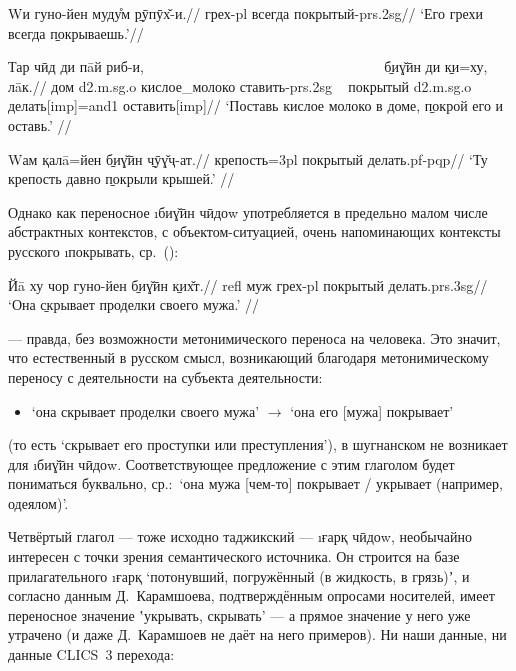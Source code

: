 \begingl
\gla Wи гуно-йен муду̊м \b{рӯпӯх̌-и}.//
 грех-{\sc pl} всегда покрытый-{\sc prs.2sg}//
\glft ‘Его грехи всегда \b{покрываешь}.’//
\endgl \xe

\begingl
\gla Тар чӣд ди пāй риб-и, ~~~~~~~~~~~~~~~~~~~~~~~~~~~~~~~~~ \b{биɣ̌ӣн} ди \b{ки}=ху, лāк.//
 дом {\sc d2.m.sg.o} кислое\_молоко ставить-{\sc prs.2sg} ~ покрытый {\sc d2.m.sg.o} делать[{\sc imp}]={\sc and1} оставить[{\sc imp}]//
\glft ‘Поставь кислое молоко в доме, \b{покрой} его и оставь.’ //
\endgl \xe

\begingl
\gla Wам қалā=йен \b{биɣ̌ӣн} \b{чӯɣ̌ҷ-ат}.//
 крепость={\sc 3pl} покрытый делать.{\sc pf-pqp}//
\glft ‘Ту крепость давно \b{покрыли} крышей.’ //
\endgl \xe

Однако как переносное \i{биɣ̌ӣн чӣдоw} употребляется в предельно малом числе абстрактных контекстов, с объектом-ситуацией, очень напоминающих контексты русского \i{покрывать}, ср.~():

\begingl
\gla Йā ху чор гуно-йен \b{биɣ̌ӣн} \b{ких̌т}.//
 {\sc refl} муж грех-{\sc pl} покрытый делать.{\sc prs.3sg}//
\glft ‘Она \b{скрывает} проделки своего мужа.’ //
\endgl \xe

— правда, без возможности метонимического переноса на человека. Это значит, что естественный в русском смысл, возникающий благодаря метонимическому переносу с деятельности на субъекта деятельности:

\begin{itemize}
  \item ‘она скрывает проделки своего мужа’ $\rightarrow$ ‘она его [мужа] покрывает’
\end{itemize}

(то есть ‘скрывает его проступки или преступления’), в шугнанском не возникает для \i{биɣ̌ӣн чӣдоw}. Соответствующее предложение с этим глаголом будет пониматься буквально, ср.:~‘она мужа [чем-то] покрывает / укрывает (например, одеялом)’.

Четвёртый глагол — тоже исходно таджикский — \i{ғарқ чӣдоw}, необычайно интересен с точки зрения семантического источника. Он строится на базе прилагательного \i{ғарқ} ‘потонувший, погружённый (в жидкость, в грязь)ʼ, и согласно данным Д.~Карамшоева, подтверждённым опросами носителей, имеет переносное значение ʽукрывать, скрывать’ — а прямое значение у него уже утрачено (и даже Д.~Карамшоев не даёт на него примеров). Ни наши данные, ни данные CLICS~3 перехода:

